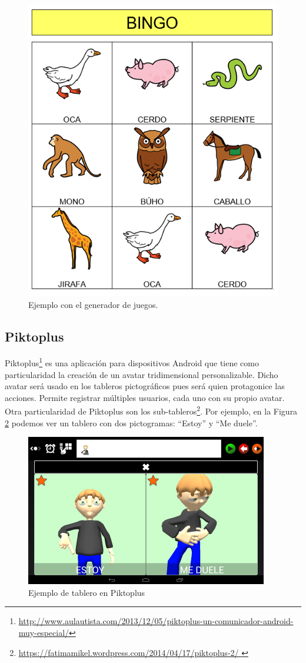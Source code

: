 \begin{itemize}
\begin{figure}[h!]
	\centering
	\includegraphics[width=0.5\linewidth]{Imagenes/Bitmap/juegoARASAAC}
	\caption{Ejemplo con el generador de juegos.}
	\label{fig:juegoarasaac}
\end{figure}



\end{itemize}



\subsection{Piktoplus}
\label{cap2:pkplus}
Piktoplus\footnote{\url{http://www.aulautista.com/2013/12/05/piktoplus-un-comunicador-android-muy-especial/}} es una aplicación para dispositivos Android que tiene como particularidad la creación de un avatar tridimensional personalizable. Dicho avatar será usado en los tableros pictográficos pues será quien protagonice las acciones. Permite registrar múltiples usuarios, cada uno con su propio avatar. Otra particularidad de Piktoplus son los sub-tableros\footnote{\url{https://fatimamikel.wordpress.com/2014/04/17/piktoplus-2/ }}. Por ejemplo, en la Figura \ref{fig:piktoplus1}  podemos ver un tablero con dos pictogramas: “Estoy” y “Me duele”.


\begin{figure}[h!]
	\centering
	\includegraphics[width=0.5\linewidth]{Imagenes/Bitmap/Piktoplus1}
	\caption[Pictoplus tablero]{Ejemplo de tablero en Piktoplus}
	\label{fig:piktoplus1}
\end{figure}


